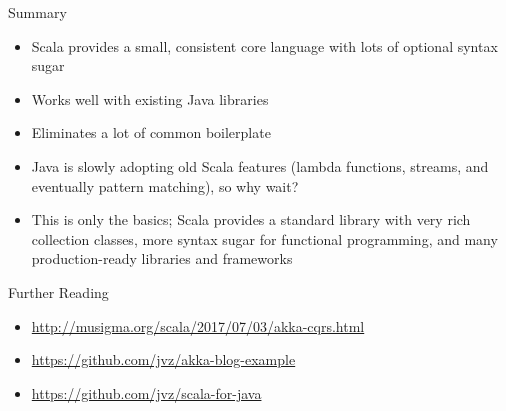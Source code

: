 \documentclass{beamer}
\begin{document}
\begin{frame}{Summary}
\begin{itemize}
\item Scala provides a small, consistent core language with lots of optional
syntax sugar
\item Works well with existing Java libraries
\item Eliminates a lot of common boilerplate
\item Java is slowly adopting old Scala features (lambda functions, streams, and
eventually pattern matching), so why wait?
\item This is only the basics; Scala provides a standard library with very rich
collection classes, more syntax sugar for functional programming, and many
production-ready libraries and frameworks
\end{itemize}
\end{frame}

\begin{frame}{Further Reading}
\begin{itemize}
\item \url{http://musigma.org/scala/2017/07/03/akka-cqrs.html}
\item \url{https://github.com/jvz/akka-blog-example}
\item \url{https://github.com/jvz/scala-for-java}
\end{itemize}
\end{frame}
\end{document}
